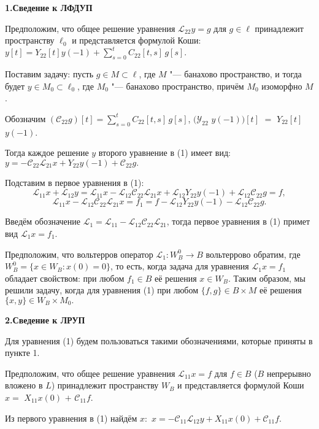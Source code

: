 \smallskip \centerline {\bf 1.Сведение к ЛФДУП} \nopagebreak

Предположим, что общее решение уравнения ${\mathcal L}_{22} y=g$ для $g\in \ell $ принадлежит пространству $\ell _{0} $ и представляется формулой Коши:
$y[t]=Y_{22} [t]y(-1)+\sum\limits_{s=0}^{t}
 C_{22} [t,s]\, g[s].$

Поставим задачу: пусть $g\in M\subset \ell $, где $M$ "--- банахово пространство, и тогда будет $y\in M_{0} \subset \ell _{0} $, где $M_{0} $ "--- банахово пространство, причём $M_{0} $ изоморфно $M$.

Обозначим $({\mathcal C}_{22} g)[t]=\sum\limits_{s=0}^{t}C_{22} [t,s]\,g[s]$, $({\mathcal Y}_{22}$ $y(-1))[t]$ $=$ $Y_{22}[t]$$y(-1)$.

Тогда каждое решение $y$ второго уравнение в (1) имеет вид:
$y=-{\mathcal C}_{22} {\mathcal L}_{21} x+Y_{22} y(-1)+{\mathcal C}_{22} g.$

Подставим в первое уравнения в (1):
$${\mathcal L}_{11} x+{\mathcal L}_{12} y= {\mathcal L}_{11} x- {\mathcal L}_{12} {\mathcal C}_{22} {\mathcal L}_{21} x+{\mathcal L}_{12} Y_{22} y(-1)+ {\mathcal L}_{12} {\mathcal C}_{22} g=f,
$$
$$ {\mathcal L}_{11} x- {\mathcal L}_{12} {\mathcal C}_{22} {\mathcal L}_{21} x=f_{1} =f- {\mathcal L}_{12} Y_{22} y(-1)-{\mathcal L}_{ 12} {\mathcal C}_{22} g.
$$

Введём обозначение ${\mathcal L}_1= {\mathcal L}_{11} - {\mathcal L}_{12} {\mathcal C}_{22} {\mathcal L}_{21}$, тогда первое уравнения в (1) примет вид ${\mathcal L}_1x=f_{1}$.

Предположим, что вольтерров оператор ${\mathcal L}_1:W_{B}^{0} \to B$ вольтеррово обратим, где $W_{B}^{0} =\{ x\in W_{B} :x(0)=0\} $, то есть, когда задача для уравнения ${\mathcal L}_1x=f_{1} $ обладает свойством: при любом $f_{1} \in B$ её решения $x\in W_{B} $. Таким образом, мы решили задачу, когда для уравнения (1) при любом $\{ f,g\} \in B\times M$ её решения $\{ x,y\} \in W_{B} \times M_{0} .$



\smallskip \centerline {\bf 2.Сведение к ЛРУП} \nopagebreak


Для уравнения (1) будем пользоваться такими обозначениями, которые приняты в пункте 1.

Предположим, что общее решение уравнения ${\mathcal L}_{11} x=f$ для $f\in B$ ($B$ непрерывно вложено в $L$) принадлежит пространству $W_{B}$ и представляется формулой Коши $x =$ $X_{11}x(0)$ $+$ ${\mathcal C}_{11}f.$

Из первого уравнения в (1) найдём $x:$
$x=-{\mathcal C}_{11} {\mathcal L}_{12} y+X_{11} x(0)+{\mathcal C}_{11} f.$

